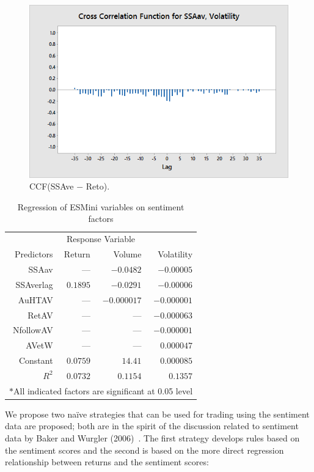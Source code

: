 	\begin{figure}[!ht]
	\centering
	\includegraphics[width=\textwidth]{chapters/chapter_news_an/figures/ch4sec4ssaavvola} 
	\caption{CCF(SSAve $-$ Reto). \label{fig:ccfssavvol}}
	\end{figure}

	\begin{table}[!ht]
	\centering
	\caption{Regression of ESMini variables on sentiment factors \label{tab:regesmini}}
	\begin{tabular}{rrrr}
	\multicolumn{4}{c}{Response Variable} \\
	Predictors & Return & Volume & Volatility \\ \hline
	SSAav & --- & $-0.0482$ & $-0.00005$ \\
	SSAverlag & $0.1895$ & $-0.0291$ & $-0.00006$ \\
	AuHTAV & --- & $-0.000017$ & $-0.000001$ \\
	RetAV & --- & --- & $-0.000063$ \\
	NfollowAV & --- & --- & $-0.000001$ \\
	AVetW & --- & --- & $0.000047$ \\
	Constant & $0.0759$ & $14.41$ & $0.000085$ \\ \hline
	$R^2$ & $0.0732$ & $0.1154$ & $0.1357$ \\ \hline
	\multicolumn{4}{c}{$\ast$All indicated factors are significant at 0.05 level}
	\end{tabular} 
	\end{table}

We propose two na\"ive strategies that can be used for trading using the sentiment data are proposed; both are in the spirit of the discussion related to sentiment data by Baker and Wurgler (2006)~\cite{baker2006investor}. The first strategy develops rules based on the sentiment scores and the second is based on the more direct regression relationship between returns and the sentiment scores: 

